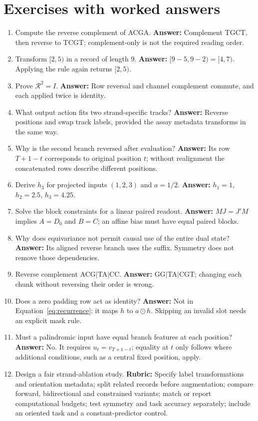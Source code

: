 \section{Exercises with worked answers}
\begin{enumerate}
\item Compute the reverse complement of ACGA. \textbf{Answer:} Complement
TGCT, then reverse to TCGT; complement-only is not the required reading order.
\item Transform $[2,5)$ in a record of length $9$. \textbf{Answer:}
$[9-5,9-2)=[4,7)$. Applying the rule again returns $[2,5)$.
\item Prove $\mathcal R^2=I$. \textbf{Answer:} Row reversal and channel
complement commute, and each applied twice is identity.
\item What output action fits two strand-specific tracks? \textbf{Answer:}
Reverse positions and swap track labels, provided the assay metadata
transforms in the same way.
\item Why is the second branch reversed after evaluation? \textbf{Answer:}
Its row $T+1-t$ corresponds to original position $t$; without realignment
the concatenated rows describe different positions.
\item Derive $h_3$ for projected inputs $(1,2,3)$ and $a=1/2$.
\textbf{Answer:} $h_1=1$, $h_2=2.5$, $h_3=4.25$.
\item Solve the block constraints for a linear paired readout.
\textbf{Answer:} $MJ=J'M$ implies $A=D_0$ and $B=C$; an affine
bias must have equal paired blocks.
\item Why does equivariance not permit causal use of the entire dual state?
\textbf{Answer:} Its aligned reverse branch uses the suffix. Symmetry
does not remove those dependencies.
\item Reverse complement ACG$\mid$TA$\mid$CC. \textbf{Answer:}
GG$\mid$TA$\mid$CGT; changing each chunk without reversing their order is wrong.
\item Does a zero padding row act as identity? \textbf{Answer:}
Not in Equation~\ref{eq:recurrence}: it maps $h$ to $a\odot h$.
Skipping an invalid slot needs an explicit mask rule.
\item Must a palindromic input have equal branch features at each position?
\textbf{Answer:} No. It requires $u_t=v_{T+1-t}$; equality at $t$
only follows where additional conditions, such as a central fixed position, apply.
\item Design a fair strand-ablation study. \textbf{Rubric:} Specify label
transformations and orientation metadata; split related records before
augmentation; compare forward, bidirectional and constrained variants;
match or report computational budgets; test symmetry and task accuracy
separately; include an oriented task and a constant-predictor control.
\end{enumerate}

